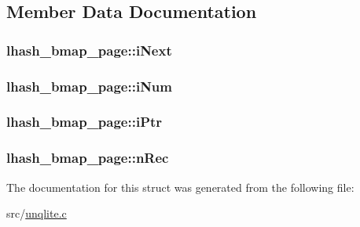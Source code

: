 \subsection{Member Data Documentation}
\hypertarget{structlhash__bmap__page_aa2d80563adb2fa0b82ddb06be5413491}{
\subsubsection[{i\-Next}]{ lhash\-\_\-bmap\-\_\-page\-::i\-Next}}\label{d3/d6f/structlhash__bmap__page_aa2d80563adb2fa0b82ddb06be5413491}
\hypertarget{structlhash__bmap__page_a75e4663046dbf7322742ada25927f2e5}{
\subsubsection[{i\-Num}]{ lhash\-\_\-bmap\-\_\-page\-::i\-Num}}\label{d3/d6f/structlhash__bmap__page_a75e4663046dbf7322742ada25927f2e5}
\hypertarget{structlhash__bmap__page_ae7ea32d4ef5d7bc09820accd34218446}{
\subsubsection[{i\-Ptr}]{ lhash\-\_\-bmap\-\_\-page\-::i\-Ptr}}\label{d3/d6f/structlhash__bmap__page_ae7ea32d4ef5d7bc09820accd34218446}
\hypertarget{structlhash__bmap__page_ab68c6df09b19a84ead9acd3faa111e8e}{
\subsubsection[{n\-Rec}]{ lhash\-\_\-bmap\-\_\-page\-::n\-Rec}}\label{d3/d6f/structlhash__bmap__page_ab68c6df09b19a84ead9acd3faa111e8e}


The documentation for this struct was generated from the following file\-:\begin{DoxyCompactItemize}
\item 
src/\hyperlink{unqlite_8c}{unqlite.\-c}\end{DoxyCompactItemize}
